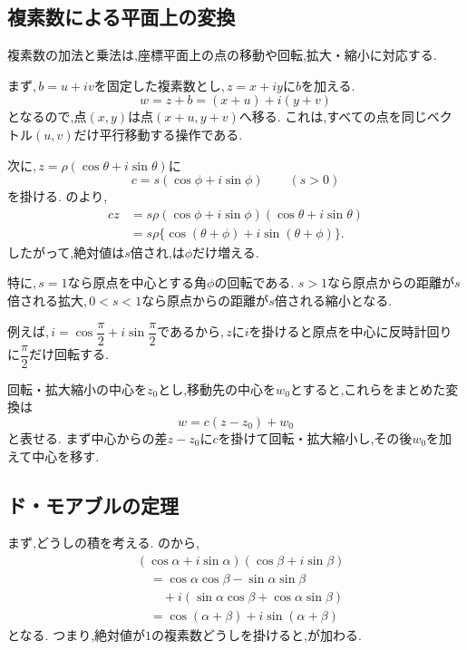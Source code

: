   \subsection{複素数による平面上の変換}\label{節：複素数による平面上の変換}

    複素数の加法と乗法は,座標平面上の点の移動や回転,拡大・縮小に対応する.

    まず,\,$b=u+iv$を固定した複素数とし,\,$z=x+iy$に$b$を加える.
    \[
      w=z+b=(x+u)+i(y+v)
    \]
    となるので,点$(x,y)$は点$(x+u,y+v)$へ移る.
    これは,すべての点を同じベクトル$(u,v)$だけ平行移動する操作である.

    次に,\,$z=\rho(\cos\theta+i\sin\theta)$に
    \[
      c=s(\cos\phi+i\sin\phi)
      \qquad(s>0)
    \]
    を掛ける.
    のより,
    \begin{align*}
      cz
        &=s\rho
          (\cos\phi+i\sin\phi)
          (\cos\theta+i\sin\theta)\\
        &=s\rho
          \{\cos(\theta+\phi)+i\sin(\theta+\phi)\}.
    \end{align*}
    したがって,絶対値は$s$倍され,は$\phi$だけ増える.

    特に,\,$s=1$なら原点を中心とする角$\phi$の回転である.
    $s>1$なら原点からの距離が$s$倍される拡大,\,$0<s<1$なら原点からの距離が$s$倍される縮小となる.
  \BookFigComplexRotation

    例えば,\,$i=\cos\dfrac{\pi}{2}+i\sin\dfrac{\pi}{2}$であるから,\,$z$に$i$を掛けると原点を中心に反時計回りに$\dfrac{\pi}{2}$だけ回転する.

    回転・拡大縮小の中心を$z_0$とし,移動先の中心を$w_0$とすると,これらをまとめた変換は
    \[
      w=c(z-z_0)+w_0
    \]
    と表せる.
    まず中心からの差$z-z_0$に$c$を掛けて回転・拡大縮小し,その後$w_0$を加えて中心を移す.

  \subsection{ド・モアブルの定理}\label{節：ド・モアブルの定理}
    まず,どうしの積を考える.
    のから,
    \begin{align*}
      &(\cos\alpha+i\sin\alpha)
       (\cos\beta+i\sin\beta)\\
      &\quad=
       \cos\alpha\cos\beta-\sin\alpha\sin\beta\\
      &\qquad
       +i(\sin\alpha\cos\beta+\cos\alpha\sin\beta)\\
      &\quad=
       \cos(\alpha+\beta)+i\sin(\alpha+\beta)
    \end{align*}
    となる.
    つまり,絶対値が$1$の複素数どうしを掛けると,が加わる.

